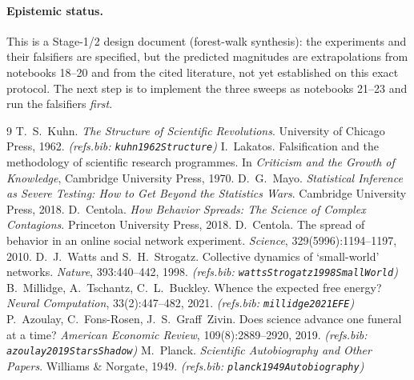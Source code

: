 \documentclass[11pt]{article}
\newcommand{\code}[1]{\texttt{#1}}
\begin{document}
\paragraph{Epistemic status.}
This is a Stage-1/2 design document (forest-walk synthesis): the experiments and
their falsifiers are specified, but the predicted magnitudes are extrapolations
from notebooks 18--20 and from the cited literature, not yet established on this
exact protocol. The next step is to implement the three sweeps as notebooks 21--23
and run the falsifiers \emph{first}.

\begin{thebibliography}{9}
 T.~S.~Kuhn. \emph{The Structure of Scientific
Revolutions}. University of Chicago Press, 1962. \emph{(refs.bib:
\code{kuhn1962Structure})}
 I.~Lakatos. Falsification and the methodology of
scientific research programmes. In \emph{Criticism and the Growth of Knowledge},
Cambridge University Press, 1970.
 D.~G.~Mayo. \emph{Statistical Inference as Severe
Testing: How to Get Beyond the Statistics Wars}. Cambridge University Press, 2018.
 D.~Centola. \emph{How Behavior Spreads: The Science of
Complex Contagions}. Princeton University Press, 2018.
 D.~Centola. The spread of behavior in an online social
network experiment. \emph{Science}, 329(5996):1194--1197, 2010.
 D.~J.~Watts and S.~H.~Strogatz. Collective
dynamics of `small-world' networks. \emph{Nature}, 393:440--442, 1998.
\emph{(refs.bib: \code{wattsStrogatz1998SmallWorld})}
 B.~Millidge, A.~Tschantz, C.~L.~Buckley. Whence the
expected free energy? \emph{Neural Computation}, 33(2):447--482, 2021.
\emph{(refs.bib: \code{millidge2021EFE})}
 P.~Azoulay, C.~Fons-Rosen, J.~S.~Graff~Zivin.
Does science advance one funeral at a time? \emph{American Economic Review},
109(8):2889--2920, 2019. \emph{(refs.bib: \code{azoulay2019StarsShadow})}
 M.~Planck. \emph{Scientific Autobiography and
Other Papers}. Williams \& Norgate, 1949. \emph{(refs.bib:
\code{planck1949Autobiography})}
\end{thebibliography}
\end{document}

